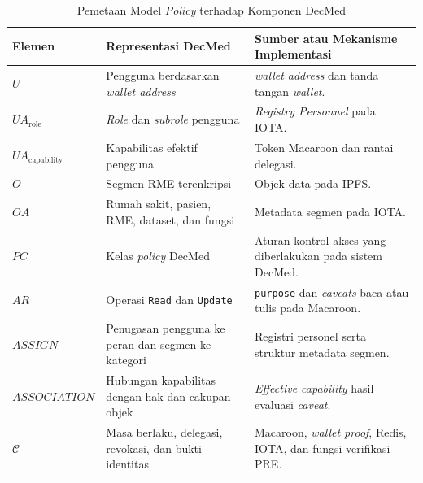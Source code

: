 \begin{table}[H]
	\centering
	\caption{Pemetaan Model \textit{Policy} terhadap Komponen DecMed}
	\label{tab:pemetaan-policy-machine-decmed}
	\small
	\begin{tabular}{|p{}|p{}|p{}|}
		\hline
		\textbf{Elemen}
		 & \textbf{Representasi DecMed}
		 & \textbf{Sumber atau Mekanisme Implementasi}                              \\ \hline

		$U$
		 & Pengguna berdasarkan \textit{wallet address}
		 & \textit{wallet address} dan tanda tangan \textit{wallet}.                \\ \hline

		$UA_{\text{role}}$
		 & \textit{Role} dan \textit{subrole} pengguna
		 & \textit{Registry Personnel} pada IOTA.                                   \\ \hline

		$UA_{\text{capability}}$
		 & Kapabilitas efektif pengguna
		 & Token Macaroon dan rantai delegasi.                                      \\ \hline

		$O$
		 & Segmen RME terenkripsi
		 & Objek data pada IPFS.                                                    \\ \hline

		$OA$
		 & Rumah sakit, pasien, RME, dataset, dan fungsi
		 & Metadata segmen pada IOTA.                                               \\ \hline

		$PC$
		 & Kelas \textit{policy} DecMed
		 & Aturan kontrol akses yang diberlakukan pada sistem DecMed.               \\ \hline

		$AR$
		 & Operasi \texttt{Read} dan \texttt{Update}
		 & \texttt{purpose} dan \textit{caveats} baca atau tulis pada Macaroon.     \\ \hline

		$ASSIGN$
		 & Penugasan pengguna ke peran dan segmen ke kategori
		 & Registri personel serta struktur metadata segmen.                        \\ \hline

		$ASSOCIATION$
		 & Hubungan kapabilitas dengan hak dan cakupan objek
		 & \textit{Effective capability} hasil evaluasi \textit{caveat}.            \\ \hline

		$\mathcal{C}$
		 & Masa berlaku, delegasi, revokasi, dan bukti identitas
		 & Macaroon, \textit{wallet proof}, Redis, IOTA, dan fungsi verifikasi PRE. \\ \hline
	\end{tabular}

\end{table}

